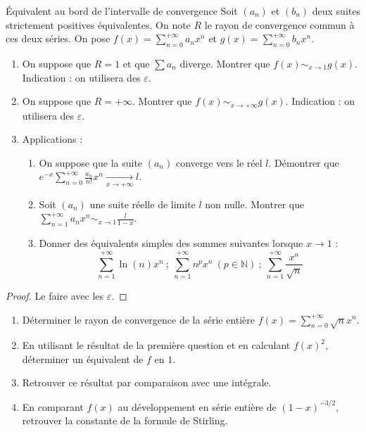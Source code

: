 \documentclass[french,a4paper]{article}
\newcommand{\N}{\mathbb{N}}
\theoremstyle{plain}
\theoremstyle{definition}
\theoremstyle{remark}
\begin{document}
\begin{ex}[Châteaux]{Équivalent au bord de l'intervalle de convergence}
	Soit $(a_n)$ et $(b_n)$ deux suites strictement positives équivalentes. On note $R$ le rayon de convergence commun à ces deux séries. On pose $f(x)=\displaystyle\sum_{n=0}^{+\infty}a_nx^n$ et $g(x)=\displaystyle\sum_{n=0}^{+\infty}b_nx^n$.
	\begin{enumerate}
		\item On suppose que $R=1$ et que $\sum a_n$ diverge. Montrer que $f(x)\sim_{x\to 1}g(x)$. Indication : on utilisera des $\varepsilon$.
		\item On suppose que $R=+\infty$. Montrer que $f(x)\sim_{x\to +\infty}g(x)$. Indication : on utilisera des $\varepsilon$.
		\item Applications : 
		\begin{enumerate}[label=\alph*.]
			\item On suppose que la suite $(a_n)$ converge vers le réel $l$. Démontrer que $\displaystyle e^{-x}\sum_{n=0}^{+\infty}\frac{a_n}{n!}x^n\xrightarrow[x\to +\infty]{}l$.
			\item Soit $(a_n)$ une suite réelle de limite $l$ non nulle. Montrer que $\displaystyle\sum_{n=1}^{+\infty}a_nx^n\sim_{x\to 1}\frac{l}{1-x}$.
			\item Donner des équivalents simples des sommes suivantes lorsque $x\to 1$ : $$\sum_{n=1}^{+\infty}\ln(n)x^n\ ; \ \sum_{n=1}^{+\infty}n^px^n\ (p\in\N)\ ;\ \sum_{n=1}^{+\infty}\frac{x^n}{\sqrt{n}}$$
		\end{enumerate}
	\end{enumerate}
\end{ex}
\begin{proof}
	Le faire avec les $\varepsilon$.
\end{proof}

\begin{ex}[Moulin.SE.12]{}
	\begin{enumerate}
		\item Déterminer le rayon de convergence de la série entière $f(x)=\displaystyle\sum_{n=0}^{+\infty}\sqrt{n}x^n$.
		\item En utilisant le résultat de la première question et en calculant $f(x)^2$, déterminer un équivalent de $f$ en $1$.
		\item Retrouver ce résultat par comparaison avec une intégrale.
		\item En comparant $f(x)$ au développement en série entière de $(1-x)^{-3/2}$, retrouver la constante de la formule de Stirling.
	\end{enumerate}
\end{ex}
\end{document}
